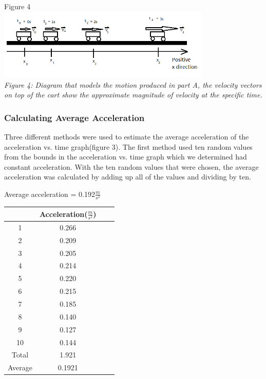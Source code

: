 \documentclass[aps,letterpaper,11pt]{revtex4}
\begin{document}
\begin{center}
Figure 4\\
\includegraphics[width=4in]{VectorPartA.png}\\
\textit{Figure 4: Diagram that models the motion produced in part A, the velocity vectors on top of the cart show the approximate magnitude of velocity at the specific time.}
\end{center}

\subsubsection{Calculating Average Acceleration}

Three different methods were used to estimate the average acceleration of the acceleration vs. time graph(figure 3). The first method used ten random values from the bounds in the acceleration vs. time graph which we determined had constant acceleration. With the ten random values that were chosen, the average acceleration was calculated by adding up all of the values and dividing by ten.

\begin{center}
Average acceleration = 0.192$\frac{m}{s^2}$
\begin{tabular}{ |c|c|c|c| }
\hline
 & Acceleration($\frac{m}{s^2}$)\\
\hline
1 & 0.266 \\
\hline
2 & 0.209 \\
\hline
3 & 0.205 \\
\hline
4 & 0.214 \\
\hline
5 & 0.220\\
\hline
6 & 0.215\\
\hline
7 & 0.185\\
\hline
8 & 0.140\\
\hline
9 & 0.127\\
\hline
10 & 0.144\\
\hline
Total & 1.921\\
\hline
Average & 0.1921\\
\hline
\end{tabular}
\end{center}
\end{document}
